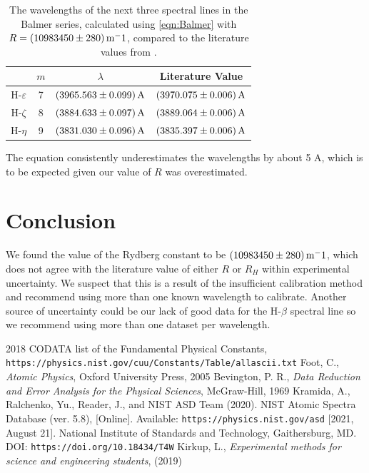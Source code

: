 \documentclass[11pt]{article}
\numberwithin{equation}{section}
\numberwithin{figure}{section}
\numberwithin{table}{section}
\begin{document}
\begin{table}[H]
    \centering
    \begin{tabular}{c|c|c|c}
         & $m$ & $\lambda$ & Literature Value \\\hline
        H-$\varepsilon$ & 7 & $\SI{3965.563\pm0.099}{A}$ & $\SI{3970.075\pm0.006}{A}$ \\\hline
        H-$\zeta$ & 8 & $\SI{3884.633\pm0.097}{A}$ & $\SI{3889.064\pm0.006}{A}$ \\\hline
        H-$\eta$ & 9 & $\SI{3831.030\pm0.096}{A}$ & $\SI{3835.397\pm0.006}{A}$ \\\hline
    \end{tabular}
    \caption{The wavelengths of the next three spectral lines in the Balmer series, calculated using \autoref{eqn:Balmer} with $R=\SI{10983450\pm280}{\metre^-1}$, compared to the literature values from \cite{Spectral Lines}.}
    \label{tbl:Balmer Next}
\end{table}

\par The equation consistently underestimates the wavelengths by about 5 A, which is to be expected given our value of $R$ was overestimated.


\section{Conclusion}\label{sec:Conclusion}
\par We found the value of the Rydberg constant to be $\SI{10983450\pm280}{\metre^-1}$, which does not agree with the literature value of either $R$ or $R_H$ within experimental uncertainty. We suspect that this is a result of the insufficient calibration method and recommend using more than one known wavelength to calibrate. Another source of uncertainty could be our lack of good data for the H-$\beta$ spectral line so we recommend using more than one dataset per wavelength.

\begin{thebibliography}{9}
    2018 CODATA list of the Fundamental Physical Constants, \texttt{https://physics.nist.gov/cuu/Constants/Table/allascii.txt}
    Foot, C., \textit{Atomic Physics}, Oxford University Press, 2005
    Bevington, P. R., \textit{Data Reduction and Error Analysis for the Physical Sciences}, McGraw-Hill, 1969
    Kramida, A., Ralchenko, Yu., Reader, J., and NIST ASD Team (2020). NIST Atomic Spectra Database (ver. 5.8), [Online]. Available: \texttt{https://physics.nist.gov/asd} [2021, August 21]. National Institute of Standards and Technology, Gaithersburg, MD. DOI: \texttt{https://doi.org/10.18434/T4W}
    Kirkup, L., \textit{Experimental methods for science and engineering students}, (2019)
\end{thebibliography}
\end{document}
